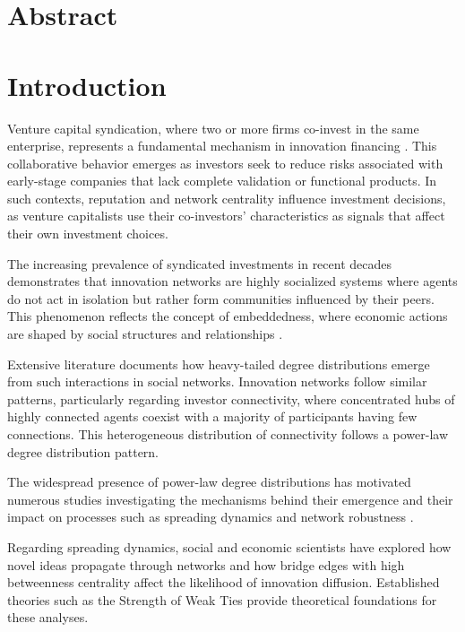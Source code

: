 \section*{Abstract}


\section{Introduction}


Venture capital syndication, where two or more firms co-invest in the same enterprise, represents a fundamental mechanism in innovation financing \cite{Granovetter1985}. This collaborative behavior emerges as investors seek to reduce risks associated with early-stage companies that lack complete validation or functional products. In such contexts, reputation and network centrality influence investment decisions, as venture capitalists use their co-investors' characteristics as signals that affect their own investment choices.

The increasing prevalence of syndicated investments in recent decades demonstrates that innovation networks are highly socialized systems where agents do not act in isolation but rather form communities influenced by their peers. This phenomenon reflects the concept of embeddedness, where economic actions are shaped by social structures and relationships \cite{Granovetter1985}.

Extensive literature documents how heavy-tailed degree distributions emerge from such interactions in social networks. Innovation networks follow similar patterns, particularly regarding investor connectivity, where concentrated hubs of highly connected agents coexist with a majority of participants having few connections. This heterogeneous distribution of connectivity follows a power-law degree distribution pattern.

The widespread presence of power-law degree distributions has motivated numerous studies investigating the mechanisms behind their emergence and their impact on processes such as spreading dynamics \cite{PastorSatorras2001} and network robustness \cite{Albert2000}.

Regarding spreading dynamics, social and economic scientists have explored how novel ideas propagate through networks and how bridge edges with high betweenness centrality affect the likelihood of innovation diffusion. Established theories such as the Strength of Weak Ties \cite{Granovetter1973} provide theoretical foundations for these analyses.

